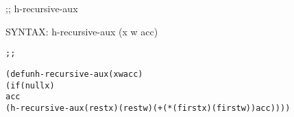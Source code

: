 \begin{aibox}{\function}
;; h-recursive-aux

SYNTAX: h-recursive-aux (x w acc)
\end{aibox}

\begin{aibox}{\examples}

\end{aibox}

\begin{aibox}{\comments}

\end{aibox}
\begin{aibox}{\answers}

\end{aibox}
\begin{aibox}{\othercomments}

\end{aibox}
\begin{aibox}{\pseudocode}

\end{aibox}
\begin{aibox}{\code}

\begin{alltt}
;;%% code

(defun h-recursive-aux (x w acc)
        (if (null x)
            acc
        (h-recursive-aux (rest x) (rest w) ( + (* (first x)  (first w)) acc))))
\end{alltt}
\end{aibox}
